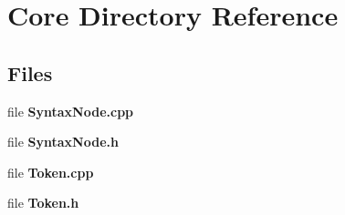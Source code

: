 \section{Core Directory Reference}
\label{dir_c6310732a22f63c0c2fc5595561e68f1}
\subsection*{Files}
\begin{DoxyCompactItemize}
\item 
file {\bf Syntax\-Node.\-cpp}
\item 
file {\bf Syntax\-Node.\-h}
\item 
file {\bf Token.\-cpp}
\item 
file {\bf Token.\-h}
\end{DoxyCompactItemize}

